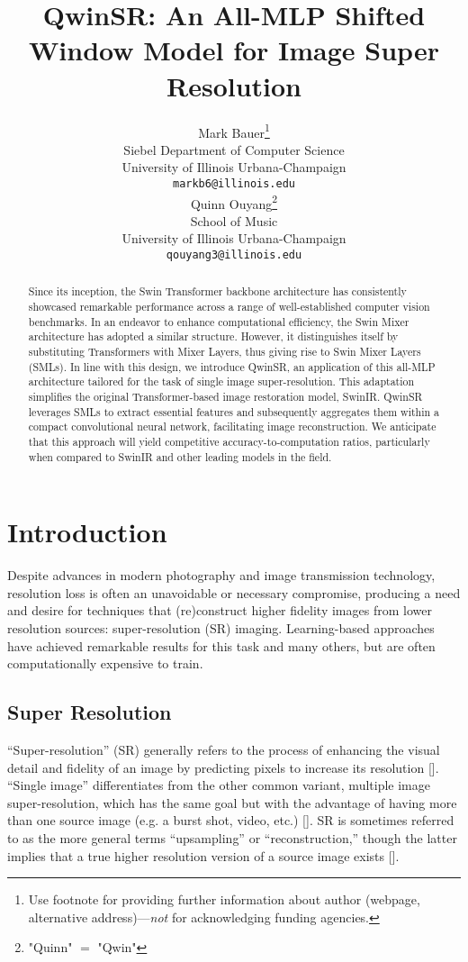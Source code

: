 \documentclass{article}
\title{QwinSR: An All-MLP Shifted Window Model for Image Super Resolution}
\author{
  Mark Bauer\thanks{Use footnote for providing further information
    about author (webpage, alternative address)---\emph{not} for acknowledging
    funding agencies.} \\
  Siebel Department of Computer Science\\
  University of Illinois Urbana-Champaign\\
  \texttt{markb6@illinois.edu} \\
  \And
  Quinn Ouyang\thanks{"Quinn" $=$ "Qwin"} \\
  School of Music \\
  University of Illinois Urbana-Champaign \\
  \texttt{qouyang3@illinois.edu} \\
}
\begin{document}
\maketitle

\begin{abstract}
    Since its inception, the Swin Transformer backbone architecture has consistently showcased remarkable performance across a range of well-established computer vision benchmarks. In an endeavor to enhance computational efficiency, the Swin Mixer architecture has adopted a similar structure. However, it distinguishes itself by substituting Transformers with Mixer Layers, thus giving rise to Swin Mixer Layers (SMLs). In line with this design, we introduce QwinSR, an application of this all-MLP architecture tailored for the task of single image super-resolution. This adaptation simplifies the original Transformer-based image restoration model, SwinIR. QwinSR leverages SMLs to extract essential features and subsequently aggregates them within a compact convolutional neural network, facilitating image reconstruction. We anticipate that this approach will yield competitive accuracy-to-computation ratios, particularly when compared to SwinIR and other leading models in the field.
\end{abstract}

\section{Introduction}

Despite advances in modern photography and image transmission technology, resolution loss is often an unavoidable or necessary compromise, producing a need and desire for techniques that (re)construct higher fidelity images from lower resolution sources: super-resolution (SR) imaging. Learning-based approaches have achieved remarkable results for this task and many others, but are often computationally expensive to train.

\subsection{Super Resolution}

“Super-resolution” (SR) generally refers to the process of enhancing the visual detail and fidelity of an image by predicting pixels to increase its resolution []. “Single image” differentiates from the other common variant, multiple image super-resolution, which has the same goal but with the advantage of having more than one source image (e.g. a burst shot, video, etc.) []. SR is sometimes referred to as the more general terms “upsampling” or “reconstruction,” though the latter implies that a true higher resolution version of a source image exists [].
\end{document}
